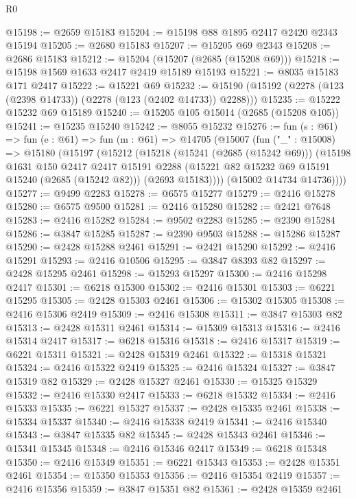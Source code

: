 \begin{lexlean}{R0}
\begin{coremodule}
@15198 := @2659 @15183
@15204 := @15198 @88 @1895 @2417 @2420 @2343 @15194
@15205 := @2680 @15183
@15207 := @15205 @69 @2343
@15208 := @2686 @15183
@15212 := @15204 (@15207 (@2685 (@15208 @69)))
@15218 := @15198 @1569 @1633 @2417 @2419 @15189 @15193
@15221 := @8035 @15183 @171 @2417
@15222 := @15221 @69
@15232 := @15190 (@15192 (@2278 (@123 (@2398 @14733)) (@2278 (@123 (@2402 @14733)) @2288)))
@15235 := @15222 @15232 @69 @15189
@15240 := @15205 @105 @15014 (@2685 (@15208 @105))
@15241 := @15235 @15240
@15242 := @8055 @15232
@15276 := fun (s : @61) =>
  fun (e : @61) =>
  fun (m : @61) =>
  @14705
    (@15007
      (fun ("_" : @15008) =>
      @15180
        (@15197
          (@15212
            (@15218
              (@15241 (@2685 (@15242 @69)))
              (@15198
                @1631
                @150
                @2417
                @2417
                @15191
                @2288
                (@15221 @82 @15232 @69 @15191 @15240 (@2685 (@15242 @82)))
                (@2693 @15183))))
          (@15002 @14734 @14736))))
@15277 := @9499 @2283
@15278 := @6575 @15277
@15279 := @2416 @15278
@15280 := @6575 @9500
@15281 := @2416 @15280
@15282 := @2421 @7648
@15283 := @2416 @15282
@15284 := @9502 @2283
@15285 := @2390 @15284
@15286 := @3847 @15285
@15287 := @2390 @9503
@15288 := @15286 @15287
@15290 := @2428 @15288 @2461
@15291 := @2421 @15290
@15292 := @2416 @15291
@15293 := @2416 @10506
@15295 := @3847 @8393 @82
@15297 := @2428 @15295 @2461
@15298 := @15293 @15297
@15300 := @2416 @15298 @2417
@15301 := @6218 @15300
@15302 := @2416 @15301
@15303 := @6221 @15295
@15305 := @2428 @15303 @2461
@15306 := @15302 @15305
@15308 := @2416 @15306 @2419
@15309 := @2416 @15308
@15311 := @3847 @15303 @82
@15313 := @2428 @15311 @2461
@15314 := @15309 @15313
@15316 := @2416 @15314 @2417
@15317 := @6218 @15316
@15318 := @2416 @15317
@15319 := @6221 @15311
@15321 := @2428 @15319 @2461
@15322 := @15318 @15321
@15324 := @2416 @15322 @2419
@15325 := @2416 @15324
@15327 := @3847 @15319 @82
@15329 := @2428 @15327 @2461
@15330 := @15325 @15329
@15332 := @2416 @15330 @2417
@15333 := @6218 @15332
@15334 := @2416 @15333
@15335 := @6221 @15327
@15337 := @2428 @15335 @2461
@15338 := @15334 @15337
@15340 := @2416 @15338 @2419
@15341 := @2416 @15340
@15343 := @3847 @15335 @82
@15345 := @2428 @15343 @2461
@15346 := @15341 @15345
@15348 := @2416 @15346 @2417
@15349 := @6218 @15348
@15350 := @2416 @15349
@15351 := @6221 @15343
@15353 := @2428 @15351 @2461
@15354 := @15350 @15353
@15356 := @2416 @15354 @2419
@15357 := @2416 @15356
@15359 := @3847 @15351 @82
@15361 := @2428 @15359 @2461

\end{coremodule}
\end{lexlean}
